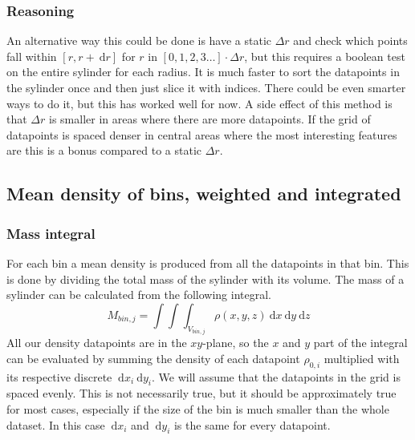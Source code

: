 \documentclass[a4paper, 12pt, english, titlepage]{article}
\newcommand{\D}[1]{\ \mathrm{d}#1} %
\begin{document}
    \subsubsection{Reasoning}
        An alternative way this could be done is have a static $\Delta r$ and check which points fall within $[r, r + \D r]$ for $r$ in $[0, 1, 2, 3 \hdots]\cdot\Delta r$, but this requires a boolean test on the entire sylinder for each radius. It is much faster to sort the datapoints in the sylinder once and then just slice it with indices. There could be even smarter ways to do it, but this has worked well for now. A side effect of this method is that $\Delta r$ is smaller in areas where there are more datapoints. If the grid of datapoints is spaced denser in central areas where the most interesting features are this is a bonus compared to a static $\Delta r$.


\subsection{Mean density of bins, weighted and integrated}

    \subsubsection{Mass integral}
        For each bin a mean density is produced from all the datapoints in that bin. This is done by dividing the total mass of the sylinder with its volume. The mass of a sylinder can be calculated from the following integral.
        $$
        M_{bin,j} = \int\int\int_{V_{bin,j}} \rho(x,y,z) \D{x}\D{y}\D{z}
        $$
        All our density datapoints are in the $xy$-plane, so the $x$ and $y$ part of the integral can be evaluated by summing the density of each datapoint $\rho_{0,i}$ multiplied with its respective discrete $\D{x_i}\D{y_i}$. We will assume that the datapoints in the grid is spaced evenly. This is not necessarily true, but it should be approximately true for most cases, especially if the size of the bin is much smaller than the whole dataset. In this case $\D{x_i}$ and $\D{y_i}$ is the same for every datapoint.
\end{document}

